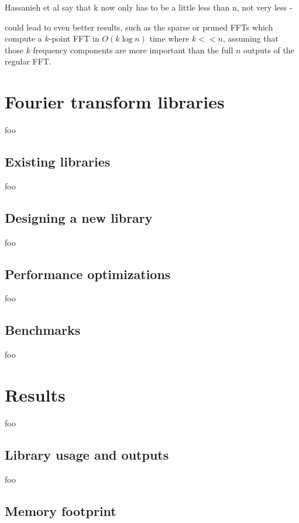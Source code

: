 \documentclass[letter,12pt,notitlepage]{article}
\begin{document}
Hassanieh et al say that k now only has to be a little less than n, not very less - 

 could lead to even better results, such as the sparse or pruned FFTs which compute a $k$-point FFT in $O(k \log n)$ time where $k << n$, assuming that those $k$ frequency components are more important than the full $n$ outputs of the regular FFT.

\vfill
\clearpage

\section{Fourier transform libraries}
\label{sec:libraries}

foo

\subsection{Existing libraries}

foo

\subsection{Designing a new library}

foo

\subsection{Performance optimizations}

foo

\subsection{Benchmarks}

foo

\vfill
\clearpage

\section{Results}
\label{sec:results}

foo

\subsection{Library usage and outputs}

foo

\subsection{Memory footprint}
\end{document}
